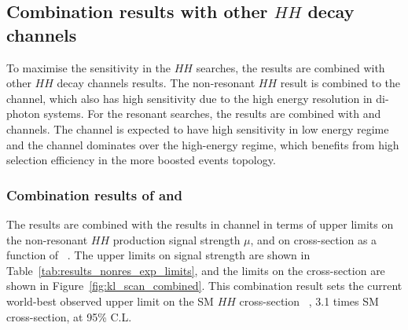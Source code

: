 \newpage

\subsection{Combination results with other $HH$ decay channels}
\label{sec:DiHiggs:combination-HH}
To maximise the sensitivity in the $HH$ searches, 
the \bbtt results are combined with other $HH$ decay channels results.
The \bbtt non-resonant $HH$ result is combined to the \bbyy channel, 
which also has high sensitivity due to the high energy resolution in 
di-photon systems.
For the resonant searches, the \bbtt results are combined with
\bbyy and \bbbb channels.
The \bbyy channel is expected to have high sensitivity in low energy
regime and the \bbbb channel dominates over the high-energy regime, which
benefits from high selection efficiency in the more boosted events topology.



\subsubsection{Combination results of \bbtt and \bbyy}

The \bbtt results are combined with the results in \bbyy channel 
in terms of upper limits on the non-resonant $HH$ production signal strength $\mu$, 
and on cross-section as a function of \kl~\cite{ATLAS-CONF-2021-052}.
The upper limits on signal strength 
are shown in Table~\ref{tab:results_nonres_exp_limits}, and the
limits on the cross-section are shown in Figure~\ref{fig:kl_scan_combined}.
This combination result sets the current world-best observed upper limit on the SM $HH$ cross-section
~\cite{PhysRevLett.122.121803,  CMS-PAS-HIG-20-004, CMS-PAS-HIG-20-005,CMS-HIG-19-018}, 3.1 times 
SM cross-section, at 95\% C.L. 

